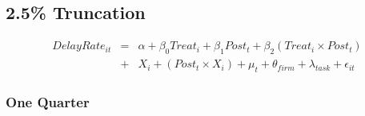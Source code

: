 \documentclass[
]{article}
\begin{document}
\hypertarget{truncation}{%
\subsection{2.5\% Truncation}\label{truncation}}

\[ \begin{aligned} DelayRate_{it} &=& \alpha+\beta_0 Treat_i + \beta_1 Post_t + \beta_2 (Treat_i \times Post_t)\\
&+&  X_i + (Post_t \times X_i) + \mu_t + \theta_{firm} + \lambda_{task}+ \epsilon_{it}
\end{aligned}\]

\hypertarget{one-quarter-1}{%
\subsubsection{One Quarter}\label{one-quarter-1}}
\end{document}
